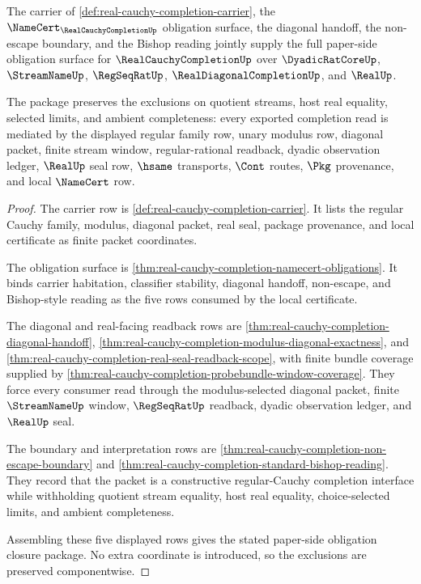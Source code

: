 \begin{theorem}
\label{thm:real-cauchy-completion-obligation-closure-package}
The carrier of \autoref{def:real-cauchy-completion-carrier}, the
$\NameCert_{\RealCauchyCompletionUp}$ obligation surface, the diagonal handoff,
the non-escape boundary, and the Bishop reading jointly supply the full
paper-side obligation surface for $\RealCauchyCompletionUp$ over
$\DyadicRatCoreUp$, $\StreamNameUp$, $\RegSeqRatUp$,
$\RealDiagonalCompletionUp$, and $\RealUp$.

The package preserves the exclusions on quotient streams, host real equality,
selected limits, and ambient completeness: every exported completion read is
mediated by the displayed regular family row, unary modulus row, diagonal
packet, finite stream window, regular-rational readback, dyadic observation
ledger, $\RealUp$ seal row, $\hsame$ transports, $\Cont$ routes, $\Pkg$
provenance, and local $\NameCert$ row.
\end{theorem}
\begin{proof}
The carrier row is \autoref{def:real-cauchy-completion-carrier}. It lists the
regular Cauchy family, modulus, diagonal packet, real seal, package provenance,
and local certificate as finite packet coordinates.

The obligation surface is \autoref{thm:real-cauchy-completion-namecert-obligations}.
It binds carrier habitation, classifier stability, diagonal handoff,
non-escape, and Bishop-style reading as the five rows consumed by the local
certificate.

The diagonal and real-facing readback rows are
\autoref{thm:real-cauchy-completion-diagonal-handoff},
\autoref{thm:real-cauchy-completion-modulus-diagonal-exactness}, and
\autoref{thm:real-cauchy-completion-real-seal-readback-scope}, with finite
bundle coverage supplied by
\autoref{thm:real-cauchy-completion-probebundle-window-coverage}. They force every
consumer read through the modulus-selected diagonal packet, finite
$\StreamNameUp$ window, $\RegSeqRatUp$ readback, dyadic observation ledger, and
$\RealUp$ seal.

The boundary and interpretation rows are
\autoref{thm:real-cauchy-completion-non-escape-boundary} and
\autoref{thm:real-cauchy-completion-standard-bishop-reading}. They record that
the packet is a constructive regular-Cauchy completion interface while
withholding quotient stream equality, host real equality, choice-selected
limits, and ambient completeness.

Assembling these five displayed rows gives the stated paper-side obligation
closure package. No extra coordinate is introduced, so the exclusions are
preserved componentwise.
\end{proof}

